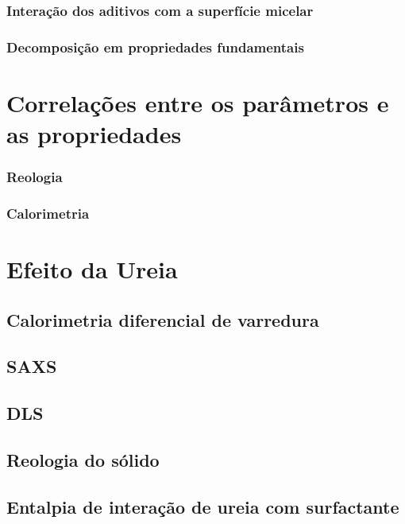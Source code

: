 		\subsection{Interação dos aditivos com a superfície micelar}
		\subsection{Decomposição em propriedades fundamentais}
	\chapter{Correlações entre os parâmetros e as propriedades}
		\subsection{Reologia}
		\subsection{Calorimetria}
	\chapter{Efeito da Ureia}
		\section{Calorimetria diferencial de varredura}
		\section{SAXS}
		\section{DLS}
		\section{Reologia do sólido}
		\section{Entalpia de interação de ureia com surfactante}